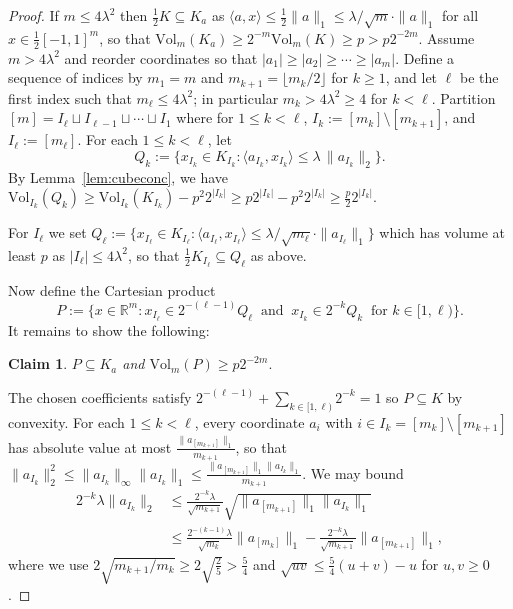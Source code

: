 \documentclass[12pt,english]{article}
\theoremstyle{theorem}
\newtheorem*{claim*}{Claim}
\theoremstyle{remark}
\providecommand{\setR}{\mathbb{R}}
\newcommand{\Vol}{\mathrm{Vol}}
\begin{document}
\fi
\begin{proof}
 If $m \le 4\lambda^2$ then $\tfrac{1}{2} K \subseteq K_a$ as $\langle a,x \rangle \le \tfrac{1}{2} \|a\|_1 \le \lambda/\sqrt{m} \cdot \|a\|_1$ for all $x \in \tfrac{1}{2} [-1,1]^m$, so that $\Vol_m (K_a) \ge 2^{-m} \Vol_m(K) \ge p > p 2^{-2m}$.
 Assume $m > 4 \lambda^2$ and reorder coordinates so that $|a_1| \ge |a_2| \ge \cdots \ge |a_m|$.
Define a sequence of indices by $m_1=m$ and $m_{k+1}=\lfloor m_k/2\rfloor$ for $k \ge 1$, and let $\ell$ be the first index such that $m_\ell\le 4\lambda^2$; in particular $m_k > 4\lambda^2 \ge 4$ for $k < \ell$. Partition $[m]=I_\ell \sqcup I_{\ell-1}\sqcup\cdots\sqcup I_1$ where for $1\le k<\ell$, $I_k:=[m_k]\setminus [m_{k+1}]$, and $I_\ell := [m_\ell]$. For each $1\le k<\ell$, let
\[
    Q_k:=\Big\{x_{I_k} \in K_{I_k}:\langle a_{I_k},x_{I_k}\rangle \le \lambda\,\|a_{I_k}\|_2\Big\}.
\]
By Lemma~\ref{lem:cubeconc}, we have
$
    \Vol_{I_k}(Q_k) \ge \Vol_{I_k}(K_{I_k}) - p^2 2^{|I_k|} \ge p2^{|I_k|}-p^2 2^{|I_k|} \ge \tfrac{p}{2} 2^{|I_k|}.
$

For $I_\ell$ we set $Q_\ell :=  \Big\{ x_{I_\ell} \in K_{I_\ell}: \langle a_{I_\ell},x_{I_\ell} \rangle \le \lambda/\sqrt{m_\ell}\cdot \|a_{I_\ell}\|_1 \Big\}$ which has volume at least $p$ as $|I_\ell| \le 4\lambda^2$, so that $\tfrac{1}{2} K_{I_\ell} \subseteq Q_\ell$ as above.

Now define the Cartesian product
\[
        P := \Big\{x \in \setR^m : x_{I_\ell} \in 2^{-(\ell - 1)} Q_\ell \ \text{ and } \ x_{I_k}\in 2^{-k} Q_k\ \text{ for } k\in [1,\ell)\Big\}.
\]
It remains to show the following:
\begin{claim*}
$P \subseteq K_a$ and $\Vol_m (P) \ge p 2^{-2m}.$
\end{claim*}

The chosen coefficients satisfy $2^{-(\ell-1)}+\sum_{k\in [1,\ell)}2^{-k}=1$ so $P\subseteq K$ by convexity.
For each $1\le k<\ell$, every coordinate $a_i$ with  $i \in I_k = [m_k] \setminus [m_{k+1}]$ has absolute value at most $\frac{\|a_{[m_{k+1}]}\|_1}{m_{k+1}}$, so that $\|a_{I_k}\|_2^2 \le \|a_{I_k}\|_\infty\|a_{I_k}\|_1 \le \frac{\|a_{[m_{k+1}]}\|_1\|a_{I_k}\|_1}{m_{k+1}}$. We may bound
\[
\begin{aligned}
       2^{-k} \lambda \|a_{I_k}\|_2  &\le \frac{2^{-k}\lambda}{\sqrt{m_{k+1}}}  \sqrt{\|a_{[m_{k+1}]}\|_1\|a_{I_k}\|_1} \\ &\le \frac{2^{-(k-1)}\lambda}{\sqrt{m_k}}\|a_{[m_k]}\|_1 - \frac{2^{-k}\lambda}{\sqrt{m_{k+1}}} \|a_{[m_{k+1}]}\|_1,
\end{aligned}
\]
where we use $2\sqrt{m_{k+1}/m_k} \ge 2 \sqrt{\tfrac{2}{5}} > \frac{5}{4}$ and $\sqrt{uv} \le \frac{5}{4} (u+v) - u$ for $u,v \ge 0$.



\end{proof}
\end{document}
